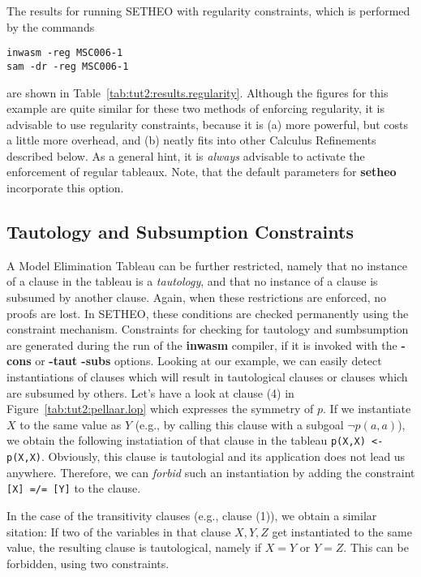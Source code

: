 The results for running SETHEO with regularity constraints, which
is performed by the commands
\begin{center}
\begin{verbatim}
inwasm -reg MSC006-1
sam -dr -reg MSC006-1
\end{verbatim}
\end{center}
are shown in Table~\ref{tab:tut2:results.regularity}.
Although the figures for this example are quite similar for these
two methods of enforcing regularity, it is advisable to use regularity
constraints,
because it is (a) more powerful, but costs a little
more overhead, and (b) neatly fits into other Calculus Refinements
described below. As a general hint, it is {\em always\/} advisable to
activate the enforcement of regular tableaux. Note, that the
default parameters for {\bf setheo} incorporate this option.

\subsection{Tautology and Subsumption Constraints}

A Model Elimination Tableau can be further restricted, namely that
no instance of a clause in the tableau is a {\em tautology\/}, and
that no instance of a clause is subsumed by another clause.
Again, when these restrictions are enforced, no proofs are lost.
In SETHEO, these conditions are checked permanently using
the constraint mechanism. Constraints for checking for tautology and
sumbsumption are generated during the run of the {\bf inwasm} compiler,
if it is invoked with the {\bf -cons} or {\bf -taut -subs} options.
Looking at our example, we can easily detect instantiations of clauses
which will result in tautological clauses or clauses which are subsumed
by others. Let's have a look at clause (4) in 
Figure~\ref{tab:tut2:pellaar.lop} which expresses the symmetry of $p$.
If we instantiate $X$ to the same value as $Y$ (e.g., by calling this
clause with a subgoal $\neg p(a,a)$), we obtain the following
instatiation of that clause in the tableau
{\tt p(X,X) <- p(X,X)}. Obviously, this clause is tautologial and
its application does not lead us anywhere. Therefore, we can {\em forbid\/}
such an instantiation by adding the constraint {\tt [X] =/= [Y]}
to the clause.

In the case of the transitivity clauses (e.g., clause (1)), 
we obtain a similar sitation:
If two of the variables in that clause $X,Y,Z$ get instantiated to the
same value, the resulting clause is tautological, namely if
$X = Y$ or $Y = Z$. This can be forbidden, using two constraints.

